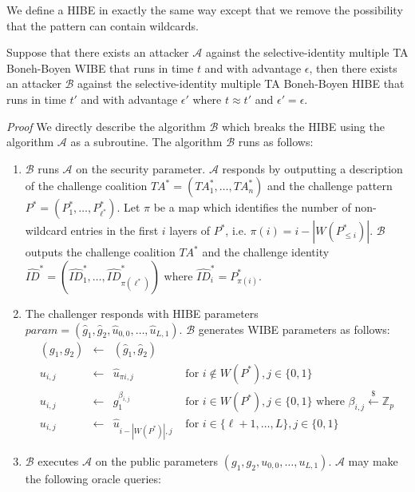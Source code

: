 \documentclass{llncs}
\newcommand{\A}{\mathcal{A}}
\newcommand{\B}{\mathcal{B}}
\newcommand{\ID}{\mathit{ID}}
\newcommand{\TA}{\mathit{TA}}
\newcommand{\getsr}{\stackrel{{\scriptscriptstyle\$}}{\gets}}
\begin{document}
We define a HIBE in exactly the same way except that we remove the possibility that the pattern can contain wildcards.

\begin{theorem}
Suppose that there exists an attacker $\A$ against the selective-identity multiple TA Boneh-Boyen WIBE that runs in time $t$ and with advantage $\epsilon$, then there exists an attacker $\B$ against the selective-identity multiple TA Boneh-Boyen HIBE that runs in time $t'$ and with advantage $\epsilon'$ where $t \approx t'$ and $\epsilon' = \epsilon$.
\end{theorem}
\emph{Proof} We directly describe the algorithm $\B$ which breaks the HIBE using the algorithm $\A$ as a subroutine. The algorithm $\B$ runs as follows:
\begin{enumerate}
\item $\B$ runs $\A$ on the security parameter. $\A$ responds by outputting a description of the challenge coalition $\TA^{*} = (\TA^{*}_{1},\ldots,\TA^{*}_{n})$ and the challenge pattern $P^{*} = (P^{*}_{1},\ldots,P^{*}_{\ell^{*}})$. Let $\pi$ be a map which identifies the number of non-wildcard entries in the first $i$ layers of $P^{*}$, i.e. $\pi(i) = i - |W(P^{*}_{\leq i})|$. $\B$ outputs the challenge coalition $\TA^{*}$ and the challenge identity $\hat{\ID}^{*}=(\hat{\ID}^{*}_{1},\ldots,\hat{\ID}^{*}_{\pi(\ell^{*})})$ where $\hat{\ID}^{*}_{i} = P^{*}_{\pi(i)}$.
\item The challenger responds with HIBE parameters $\mathit{param} = (\hat{g}_{1},\hat{g}_{2},\hat{u}_{0,0},\ldots,\hat{u}_{L,1})$. $\B$ generates WIBE parameters as follows:
    \begin{displaymath}
    \begin{array}{rcll}
    (g_{1},g_{2}) &\gets& (\hat{g}_{1},\hat{g}_{2})&\\
    u_{i,j} &\gets& \hat{u}_{\pi{i},j} &\mbox{ for } i\notin W(P^{*}), j\in\{0,1\}\\
    u_{i,j} &\gets& g_{1}^{\beta_{i,j}} &\mbox{ for } i\in W(P^{*}), j\in\{0,1\}\mbox{ where } \beta_{i,j}\getsr \mathbb{Z}_{p}\\
    u_{i,j} &\gets& \hat{u}_{i-|W(P^{*})|,j} &\mbox{ for } i\in \{\ell+1,\ldots,L\}, j\in\{0,1\}
    \end{array}
    \end{displaymath}
\item $\B$ executes $\A$ on the public parameters $(g_{1},g_{2},u_{0,0},\ldots,u_{L,1})$. $\A$ may make the following oracle queries:
    \begin{itemize}

\end{itemize}
\end{enumerate}
\end{document}
